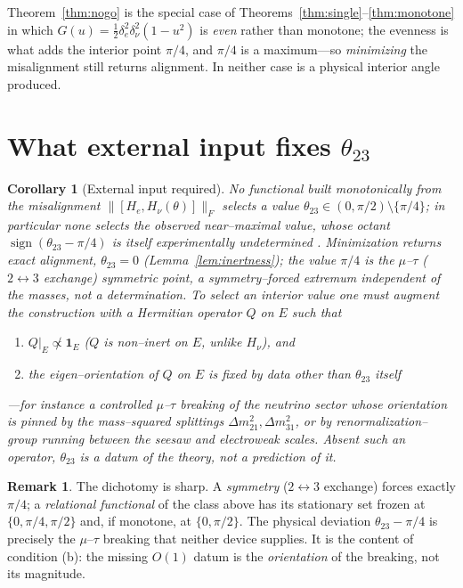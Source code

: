 \documentclass[11pt,a4paper]{article}
\newtheorem{corollary}[theorem]{Corollary}
\theoremstyle{definition}
\newtheorem{remark}[theorem]{Remark}
\newcommand{\He}{H_e}
\newcommand{\Hnu}{H_\nu}
\newcommand{\one}{\mathbf 1}
\newcommand{\Fnorm}[1]{\lVert #1 \rVert_F}
\begin{document}
\noindent Theorem~\ref{thm:nogo} is the special case of
Theorems~\ref{thm:single}--\ref{thm:monotone} in which $G(u)=\tfrac12\delta_e^2
\delta_\nu^2(1-u^2)$ is \emph{even} rather than monotone; the evenness is what adds
the interior point $\pi/4$, and $\pi/4$ is a maximum---so \emph{minimizing} the
misalignment still returns alignment. In neither case is a physical interior angle
produced.

\section{What external input fixes \texorpdfstring{$\theta_{23}$}{theta23}}\label{sec:external}

\begin{corollary}[External input required]\label{cor:external}
No functional built monotonically from the misalignment
$\Fnorm{[\He,\Hnu(\theta)]}$ selects a value $\theta_{23}\in(0,\pi/2)\setminus\{\pi/4\}$;
in particular none selects the observed near--maximal value, whose octant
$\operatorname{sign}(\theta_{23}-\pi/4)$ is itself experimentally undetermined
\cite{pdg,nufit6}. Minimization returns exact alignment, $\theta_{23}=0$
(Lemma~\ref{lem:inertness}); the value $\pi/4$ is the $\mu$--$\tau$ ($2\!\leftrightarrow\!3$
exchange) symmetric point, a symmetry--forced extremum independent of the masses,
not a determination. To select an interior value one must augment the construction
with a Hermitian operator $Q$ on $E$ such that
\begin{enumerate}
\item[(a)] $Q|_E\not\propto\one_E$ ($Q$ is \emph{non--inert} on $E$, unlike $\Hnu$),
and
\item[(b)] the eigen--orientation of $Q$ on $E$ is fixed by data other than
$\theta_{23}$ itself
\end{enumerate}
---for instance a controlled $\mu$--$\tau$ breaking of the neutrino sector whose
orientation is pinned by the mass--squared splittings $\Delta m^2_{21},\Delta
m^2_{31}$, or by renormalization--group running between the seesaw and electroweak
scales. Absent such an operator, $\theta_{23}$ is a datum of the theory, not a
prediction of it.
\end{corollary}

\begin{remark}
The dichotomy is sharp. A \emph{symmetry} ($2\!\leftrightarrow\!3$ exchange) forces
exactly $\pi/4$; a \emph{relational functional} of the class above has its
stationary set frozen at $\{0,\pi/4,\pi/2\}$ and, if monotone, at $\{0,\pi/2\}$. The
physical deviation $\theta_{23}-\pi/4$ is precisely the $\mu$--$\tau$ breaking that
neither device supplies. It is the content of condition (b): the missing $O(1)$
datum is the \emph{orientation} of the breaking, not its magnitude.
\end{remark}
\end{document}
